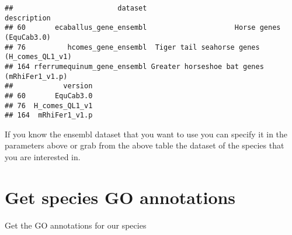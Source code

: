 \documentclass[
]{book}
\newenvironment{Shaded}{\begin{snugshade}}{\end{snugshade}}
\newcommand{\AttributeTok}[1]{\textcolor[rgb]{0.77,0.63,0.00}{#1}}
\newcommand{\FunctionTok}[1]{\textcolor[rgb]{0.00,0.00,0.00}{#1}}
\newcommand{\NormalTok}[1]{#1}
\newcommand{\OtherTok}[1]{\textcolor[rgb]{0.56,0.35,0.01}{#1}}
\newcommand{\SpecialCharTok}[1]{\textcolor[rgb]{0.00,0.00,0.00}{#1}}
\begin{document}
\begin{verbatim}
##                         dataset                                 description
## 60       ecaballus_gene_ensembl                     Horse genes (EquCab3.0)
## 76          hcomes_gene_ensembl  Tiger tail seahorse genes (H_comes_QL1_v1)
## 164 rferrumequinum_gene_ensembl Greater horseshoe bat genes (mRhiFer1_v1.p)
##            version
## 60       EquCab3.0
## 76  H_comes_QL1_v1
## 164  mRhiFer1_v1.p
\end{verbatim}

If you know the ensembl dataset that you want to use you can specify it in the parameters above or grab from the above table the dataset of the species that you are interested in.

\begin{Shaded}
\end{Shaded}

\hypertarget{get-species-go-annotations}{%
\section{Get species GO annotations}\label{get-species-go-annotations}}

Get the GO annotations for our species
\end{document}
